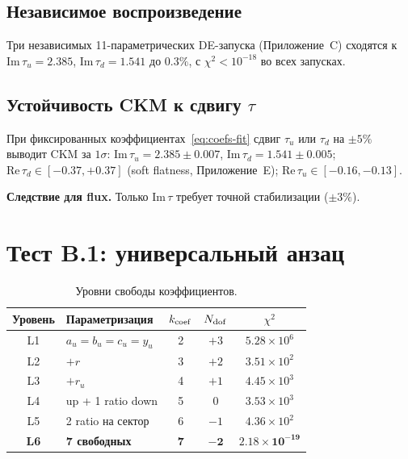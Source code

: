 \documentclass[12pt,a4paper]{article}
\numberwithin{equation}{section}
\begin{document}
\subsection{Независимое воспроизведение}
\label{sec:fermion-reproduced}

Три независимых 11-параметрических DE-запуска (Приложение~C)
сходятся к $\mathrm{Im}\,\tau_u = 2.385$, $\mathrm{Im}\,\tau_d = 1.541$
до $0.3\%$, с $\chi^2 < 10^{-18}$ во всех запусках.

\subsection{Устойчивость CKM к сдвигу $\tau$}
\label{sec:robustness}

При фиксированных коэффициентах~\eqref{eq:coefs-fit} сдвиг
$\tau_u$ или $\tau_d$ на $\pm 5\%$ выводит CKM за $1\sigma$:
$\mathrm{Im}\,\tau_u = 2.385 \pm 0.007$, $\mathrm{Im}\,\tau_d = 1.541 \pm 0.005$;
$\mathrm{Re}\,\tau_d \in [-0.37, +0.37]$ (soft flatness, Приложение~E);
$\mathrm{Re}\,\tau_u \in [-0.16, -0.13]$.

\textbf{Следствие для flux.} Только $\mathrm{Im}\,\tau$ требует
точной стабилизации ($\pm 3\%$).

\section{Тест B.1: универсальный анзац}

\begin{table}[H]
\centering
\caption{Уровни свободы коэффициентов.}
\begin{tabular}{clccc}
\toprule
Уровень & Параметризация & $k_{\rm coef}$ & $N_{\rm dof}$ & $\chi^2$ \\
\midrule
L1 & $a_u=b_u=c_u=y_u$ & 2 & $+3$ & $5.28\times10^6$ \\
L2 & $+ r$ & 3 & $+2$ & $3.51\times10^2$ \\
L3 & $+ r_u$ & 4 & $+1$ & $4.45\times10^3$ \\
L4 & up + 1 ratio down & 5 & $0$  & $3.53\times10^3$ \\
L5 & 2 ratio на сектор & 6 & $-1$ & $4.36\times10^2$ \\
\textbf{L6} & \textbf{7 свободных} & \textbf{7} & $\mathbf{-2}$ & $\mathbf{2.18\times10^{-19}}$ \\
\bottomrule
\end{tabular}
\end{table}
\end{document}
